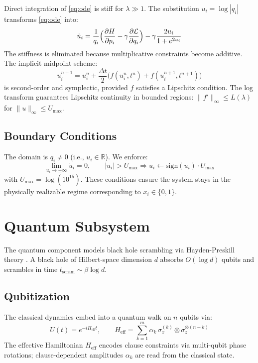 \documentclass[11pt,letterpaper]{article}
\begin{document}
Direct integration of \eqref{eq:ode} is stiff for $\lambda \gg 1$. The substitution
$u_i = \log|q_i|$ transforms \eqref{eq:ode} into:
\begin{equation}
\dot{u}_i = \frac{1}{q_i}\Bigl(\frac{\partial H}{\partial p_i} - \gamma\frac{\partial\mathcal{L}}{\partial q_i}\Bigr)
- \gamma\frac{2u_i}{1 + e^{2u_i}}
\label{eq:log_dynamics}
\end{equation}
The stiffness is eliminated because multiplicative constraints become additive. The implicit
midpoint scheme:
\begin{equation}
u_i^{n+1} = u_i^n + \frac{\Delta t}{2}\bigl(f(u_i^n, t^n) + f(u_i^{n+1}, t^{n+1})\bigr)
\label{eq:midpoint}
\end{equation}
is second-order and symplectic, provided $f$ satisfies a Lipschitz condition. The log
transform guarantees Lipschitz continuity in bounded regions: $\|f'\|_\infty \leq L(\lambda)$
for $\|u\|_\infty \leq U_{\max}$.

\subsection{Boundary Conditions}

The domain is $q_i \neq 0$ (i.e., $u_i \in \mathbb{R}$). We enforce:
\begin{equation}
\lim_{u_i \to \pm\infty} \dot{u}_i = 0, \qquad
|u_i| > U_{\max} \Rightarrow u_i \leftarrow \mathrm{sign}(u_i)\cdot U_{\max}
\end{equation}
with $U_{\max} = \log(10^{15})$. These conditions ensure the system stays in the
physically realizable regime corresponding to $x_i \in \{0,1\}$.

\section{Quantum Subsystem}
\label{sec:quantum}

The quantum component models black hole scrambling via Hayden-Preskill theory \cite{hayden2007}.
A black hole of Hilbert-space dimension $d$ absorbs $O(\log d)$ qubits and scrambles in time
$t_{\mathrm{scram}} \sim \beta \log d$.

\subsection{Qubitization}

The classical dynamics embed into a quantum walk on $n$ qubits via:
\begin{equation}
U(t) = e^{-i H_{\mathrm{eff}} t}, \qquad
H_{\mathrm{eff}} = \sum_{k=1}^m \alpha_k\, \sigma_x^{(k)} \otimes \sigma_z^{\otimes(n-k)}
\end{equation}
The effective Hamiltonian $H_{\mathrm{eff}}$ encodes clause constraints via multi-qubit
phase rotations; clause-dependent amplitudes $\alpha_k$ are read from the classical state.
\end{document}
